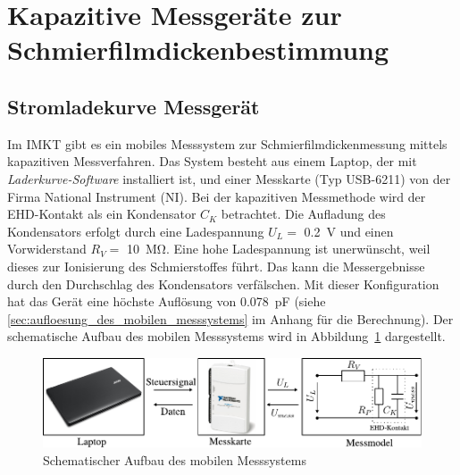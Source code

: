 \section{Kapazitive Messgeräte zur Schmierfilmdickenbestimmung}
\label{sec:kapazitive_messgeraete_zur_schmierfilmdickenbestimmung}

\subsection{Stromladekurve Messgerät}
\label{sub:stromladekurve_messgeraet}

Im IMKT gibt es ein mobiles Messsystem zur Schmierfilmdickenmessung mittels kapazitiven Messverfahren.
Das System besteht aus einem Laptop, der mit \textit{Laderkurve-Software} installiert ist, und einer Messkarte (Typ USB-6211) von der Firma National Instrument (NI).
Bei der kapazitiven Messmethode wird der EHD-Kontakt als ein Kondensator $C_K$ betrachtet.
Die Aufladung des Kondensators erfolgt durch eine Ladespannung $U_L =$ \SI{0,2}{\volt} und einen Vorwiderstand $R_V =$ \SI{10}{\mega\ohm}.
Eine hohe Ladespannung ist unerwünscht, weil dieses zur Ionisierung des Schmierstoffes führt.
Das kann die Messergebnisse durch den Durchschlag des Kondensators verfälschen.
Mit dieser Konfiguration hat das Gerät eine höchste Auflösung von \SI{0.078}{\pico\farad} (siehe \ref{sec:aufloesung_des_mobilen_messsystems} im Anhang für die Berechnung).
Der schematische Aufbau des mobilen Messsystems wird in Abbildung~\ref{fig:schematischer_aufbau_des_mobilen_messsystems} dargestellt.

\begin{figure}[htb]
    \centering
    \includegraphics[]{./images/schematischer_aufbau_des_mobilen_messsystem.pdf}
    \caption{Schematischer Aufbau des mobilen Messsystems}
    \label{fig:schematischer_aufbau_des_mobilen_messsystems}
\end{figure}

